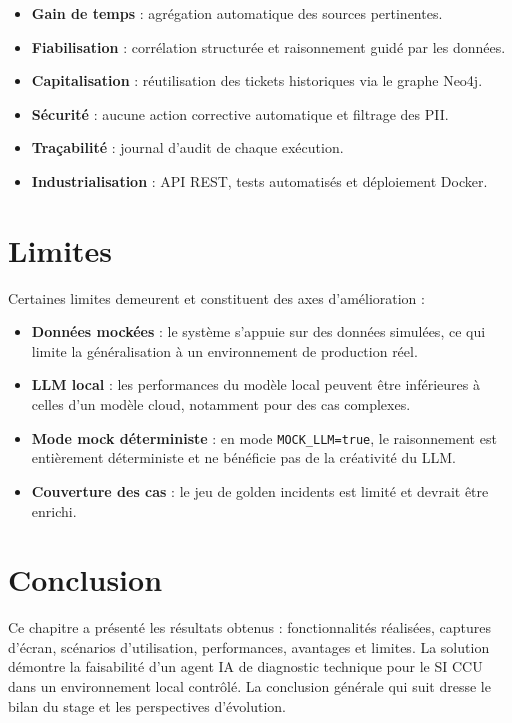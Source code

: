 \begin{itemize}
    \setlength\itemsep{0.1em}
    \setlength\parskip{0pt}
    \setlength\parsep{0pt}
    \item \textbf{Gain de temps} : agrégation automatique des sources pertinentes.
    \item \textbf{Fiabilisation} : corrélation structurée et raisonnement guidé par les données.
    \item \textbf{Capitalisation} : réutilisation des tickets historiques via le graphe Neo4j.
    \item \textbf{Sécurité} : aucune action corrective automatique et filtrage des PII.
    \item \textbf{Traçabilité} : journal d'audit de chaque exécution.
    \item \textbf{Industrialisation} : API REST, tests automatisés et déploiement Docker.
\end{itemize}

\section{Limites}
Certaines limites demeurent et constituent des axes d'amélioration :

\begin{itemize}
    \setlength\itemsep{0.1em}
    \setlength\parskip{0pt}
    \setlength\parsep{0pt}
    \item \textbf{Données mockées} : le système s'appuie sur des données simulées, ce qui limite la généralisation à un environnement de production réel.
    \item \textbf{LLM local} : les performances du modèle local peuvent être inférieures à celles d'un modèle cloud, notamment pour des cas complexes.
    \item \textbf{Mode mock déterministe} : en mode \texttt{MOCK\_LLM=true}, le raisonnement est entièrement déterministe et ne bénéficie pas de la créativité du LLM.
    \item \textbf{Couverture des cas} : le jeu de golden incidents est limité et devrait être enrichi.
\end{itemize}

\section*{Conclusion}
Ce chapitre a présenté les résultats obtenus : fonctionnalités réalisées, captures d'écran, scénarios d'utilisation, performances, avantages et limites. La solution démontre la faisabilité d'un agent IA de diagnostic technique pour le SI CCU dans un environnement local contrôlé. La conclusion générale qui suit dresse le bilan du stage et les perspectives d'évolution.
